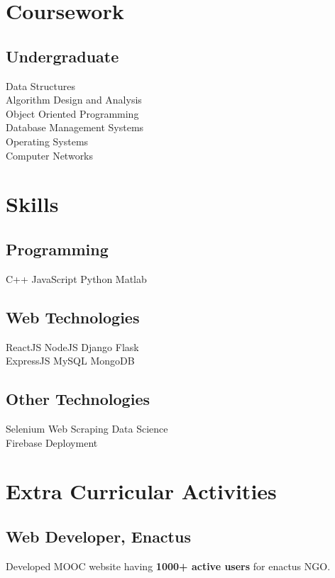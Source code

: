 \documentclass[]{ishaan-kamra-resume}
\begin{document}
\begin{minipage}[t]{0.33\textwidth}
    \section{Coursework}
    \subsection{Undergraduate}
    Data Structures \\
    Algorithm Design and Analysis \\
    Object Oriented Programming \\
    Database Management Systems \\
    Operating Systems \\
    Computer Networks \\


    \section{Skills}
    \subsection{Programming}
    C++ \textbullet{} JavaScript \textbullet{} Python \textbullet{} Matlab
    \subsection{Web Technologies}
    ReactJS \textbullet{} NodeJS \textbullet{} Django \textbullet{} Flask \\
    ExpressJS \textbullet{} MySQL \textbullet{} MongoDB
    \subsection{Other Technologies}
    Selenium \textbullet{} Web Scraping \textbullet{} Data Science \\
    Firebase \textbullet{} Deployment
    \sectionsep


    \section{Extra Curricular Activities}
    \subsection{Web Developer, Enactus}
    \textbullet{} Developed MOOC website having \textbf{1000+ active users} for enactus NGO.

\end{minipage}
\end{document}
